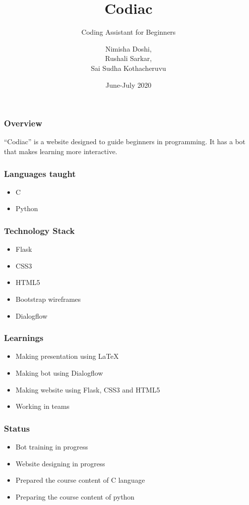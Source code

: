 \documentclass[14pt]{beamer}
\title[Codiac]{Codiac}
\subtitle[Coding Assitant]{Coding Assistant for Beginners}
\author[Team 2]{Nimisha Doshi, \\ Rushali Sarkar, \\ Sai Sudha Kothacheruvu}
\date[June 2020]{June-July 2020}
\begin{document}
\begin{frame}
    \titlepage
\end{frame}

\begin{frame}
    \frametitle{Overview}
    ``Codiac'' is a website designed to guide beginners in programming. It has a bot that makes learning more interactive.
\end{frame}

\begin{frame}
    \frametitle{Languages taught}
    \begin{itemize}
    \item C
    \item Python
\end{itemize}    
\end{frame}


\begin{frame}
    \frametitle{Technology Stack}
    \begin{itemize}
    \item Flask \\
    \item CSS3 \\
    \item HTML5 \\
    \item Bootstrap wireframes \\
    \item Dialogflow \\
\end{itemize}
\end{frame}

\begin{frame}
    \frametitle{Learnings}
    \begin{itemize}
    \item Making presentation using LaTeX \\
    \item Making bot using Dialogflow \\
    \item Making website using Flask, CSS3 and HTML5 \\
    \item Working in teams\\
\end{itemize}
\end{frame}

\begin{frame}
    \frametitle{Status}
    \begin{itemize}
    \item Bot training in progress \\
    \item Website designing in progress \\
    \item Prepared the course content of C language \\  
    \item Preparing the course content of python \\
\end{itemize}
\end{frame}
    
\end{document}
